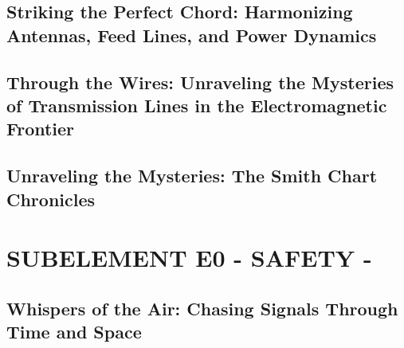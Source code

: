 \documentclass[12pt]{book}
\begin{document}
\section{Striking the Perfect Chord: Harmonizing Antennas, Feed Lines, and Power Dynamics}










\section{Through the Wires: Unraveling the Mysteries of Transmission Lines in the Electromagnetic Frontier}












\section{Unraveling the Mysteries: The Smith Chart Chronicles}











\chapter{SUBELEMENT E0 - SAFETY -}
\section{Whispers of the Air: Chasing Signals Through Time and Space}











\end{document}
